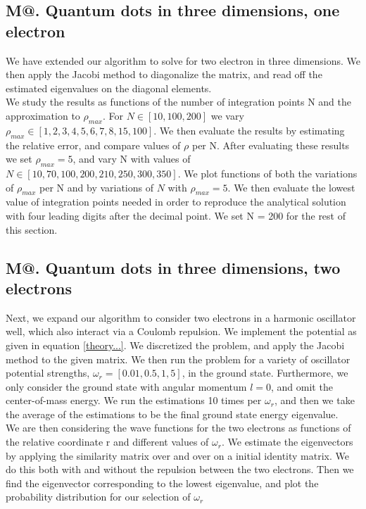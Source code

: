 \documentclass[%
reprint,
amsmath,amssymb,
aps,
]{revtex4-1}
\makeatletter
\newcommand*{\rom}[1]{\expandafter\@slowromancap\romannumeral #1@}
\makeatother
\begin{document}
\subsection*{M\rom{3}. Quantum dots in three dimensions, one electron} \noindent 
We have extended our algorithm to solve for two electron in three dimensions. We then apply the Jacobi method to diagonalize the matrix, and read off the estimated eigenvalues on the diagonal elements. \\ \indent We study the results as functions of the number of integration points N and the approximation to $\rho_{max}$. For $N\in[10,100,200]$ we vary $\rho_{max} \in [1, 2, 3, 4, 5, 6, 7, 8, 15, 100]$. We then evaluate the results by estimating the relative error, and compare values of $\rho$ per N. After evaluating these results we set $\rho_{max} = 5$, and vary N with values of $N\in[10, 70, 100, 200, 210, 250, 300, 350]$. We plot functions of both the variations of $\rho_{max}$ per N and by variations of $N$ with $\rho_{max} = 5$. We then evaluate the lowest value of integration points needed in order to reproduce the analytical solution with four leading digits after the decimal point. We set N = 200 for the rest of this section. 

\subsection*{M\rom{4}. Quantum dots in three dimensions, two electrons}
Next, we expand our algorithm to consider two electrons in a harmonic oscillator well, which also interact via a Coulomb repulsion. We implement the potential as given in equation \ref{theory...}. We discretized the problem, and apply the Jacobi method to the given matrix. We then run the problem for a variety of oscillator potential strengths, $\omega_r = [0.01,0.5,1,5]$, in the ground state. Furthermore, we only consider the ground state with angular momentum $l = 0$, and omit the center-of-mass energy. We run the estimations 10 times per $\omega_r$, and then we take the average of the estimations to be the final ground state energy eigenvalue.\\ \indent 
We are then considering the wave functions for the two electrons as functions of the relative coordinate r and different values of $\omega_r$. We estimate the eigenvectors by applying the similarity matrix over and over on a initial identity matrix. We do this both with and without the repulsion between the two electrons. Then we find the eigenvector corresponding to the lowest eigenvalue, and plot the probability distribution for our selection of $\omega_r$ 
\end{document}
